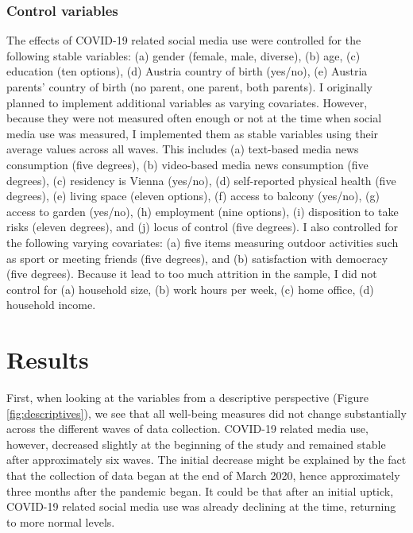 \documentclass[
  man,mask]{apa6}
\begin{document}
\hypertarget{control-variables}{%
\subsubsection{Control variables}\label{control-variables}}

The effects of COVID-19 related social media use were controlled for the following stable variables:
(a) gender (female, male, diverse), (b) age, (c) education (ten options), (d) Austria country of birth (yes/no), (e) Austria parents' country of birth (no parent, one parent, both parents).
I originally planned to implement additional variables as varying covariates.
However, because they were not measured often enough or not at the time when social media use was measured, I implemented them as stable variables using their average values across all waves.
This includes (a) text-based media news consumption (five degrees), (b) video-based media news consumption (five degrees), (c) residency is Vienna (yes/no), (d) self-reported physical health (five degrees), (e) living space (eleven options), (f) access to balcony (yes/no), (g) access to garden (yes/no), (h) employment (nine options), (i) disposition to take risks (eleven degrees), and (j) locus of control (five degrees).
I also controlled for the following varying covariates: (a) five items measuring outdoor activities such as sport or meeting friends (five degrees), and (b) satisfaction with democracy (five degrees).
Because it lead to too much attrition in the sample, I did not control for (a) household size, (b) work hours per week, (c) home office, (d) household income.

\hypertarget{results}{%
\section{Results}\label{results}}

First, when looking at the variables from a descriptive perspective (Figure \ref{fig:descriptives}), we see that all well-being measures did not change substantially across the different waves of data collection.
COVID-19 related media use, however, decreased slightly at the beginning of the study and remained stable after approximately six waves.
The initial decrease might be explained by the fact that the collection of data began at the end of March 2020, hence approximately three months after the pandemic began.
It could be that after an initial uptick, COVID-19 related social media use was already declining at the time, returning to more normal levels.
\end{document}
